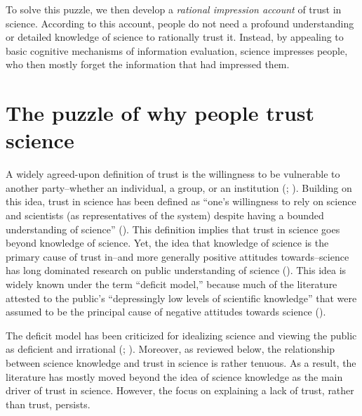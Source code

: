 \documentclass[
  man,
  floatsintext,
  longtable,
  nolmodern,
  notxfonts,
  notimes,
  colorlinks=true,linkcolor=blue,citecolor=blue,urlcolor=blue]{apa7}
\begin{document}
To solve this puzzle, we then develop a \emph{rational impression
account} of trust in science. According to this account, people do not
need a profound understanding or detailed knowledge of science to
rationally trust it. Instead, by appealing to basic cognitive mechanisms
of information evaluation, science impresses people, who then mostly
forget the information that had impressed them.

\section{The puzzle of why people trust
science}\label{the-puzzle-of-why-people-trust-science}

A widely agreed-upon definition of trust is the willingness to be
vulnerable to another party--whether an individual, a group, or an
institution
(; ). Building on this idea, trust in science has been defined as
``one's willingness to rely on science and scientists (as
representatives of the system) despite having a bounded understanding of
science'' (). This definition implies that trust in science goes
beyond knowledge of science. Yet, the idea that knowledge of science is
the primary cause of trust in--and more generally positive attitudes
towards--science has long dominated research on public understanding of
science (). This
idea is widely known under the term ``deficit model,'' because much of
the literature attested to the public's ``depressingly low levels of
scientific knowledge'' that were assumed to be the principal cause of
negative attitudes towards science
().

The deficit model has been criticized for idealizing science and viewing
the public as deficient and irrational
(;
).
Moreover, as reviewed below, the relationship between science knowledge
and trust in science is rather tenuous. As a result, the literature has
mostly moved beyond the idea of science knowledge as the main driver of
trust in science. However, the focus on explaining a lack of trust,
rather than trust, persists.
\end{document}
